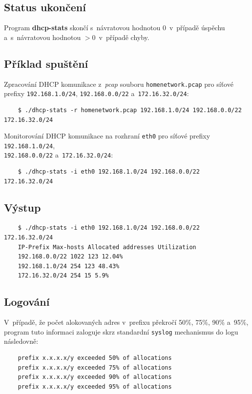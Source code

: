 \documentclass[a4paper, 11pt]{article}
\begin{document}
\subsection{Status ukončení}
Program \textbf{dhcp-stats} skončí s~návratovou hodnotou 0~v~případě úspěchu a~s~návratovou hodnotou $>$0~v~případě chyby.

\subsection{Příklad spuštění}
Zpracování DHCP komunikace z~\textit{pcap} souboru \texttt{homenetwork.pcap} pro síťové prefixy \texttt{192.168.1.0/24}, \texttt{192.168.0.0/22} a~\texttt{172.16.32.0/24}:

\begin{verbatim}
    $ ./dhcp-stats -r homenetwork.pcap 192.168.1.0/24 192.168.0.0/22 172.16.32.0/24
\end{verbatim}

Monitorování DHCP komunikace na rozhraní \texttt{eth0} pro síťové prefixy \texttt{192.168.1.0/24}, \\\texttt{192.168.0.0/22} a~\texttt{172.16.32.0/24}:

\begin{verbatim}
    $ ./dhcp-stats -i eth0 192.168.1.0/24 192.168.0.0/22 172.16.32.0/24
\end{verbatim}

\subsection{Výstup}
\label{output}
\begin{verbatim}
    $ ./dhcp-stats -i eth0 192.168.1.0/24 192.168.0.0/22 172.16.32.0/24
    IP-Prefix Max-hosts Allocated addresses Utilization
    192.168.0.0/22 1022 123 12.04%
    192.168.1.0/24 254 123 48.43%
    172.16.32.0/24 254 15 5.9%
\end{verbatim}

\subsection{Logování}
V~případě, že počet alokovaných adres v~prefixu překročí 50\%, 75\%, 90\% a~95\%, program tuto informaci zaloguje skrz standardní \texttt{syslog} \cite{syslog} mechanismus do logu následovně:

\begin{verbatim}
    prefix x.x.x.x/y exceeded 50% of allocations
    prefix x.x.x.x/y exceeded 75% of allocations
    prefix x.x.x.x/y exceeded 90% of allocations
    prefix x.x.x.x/y exceeded 95% of allocations
\end{verbatim}
\end{document}
